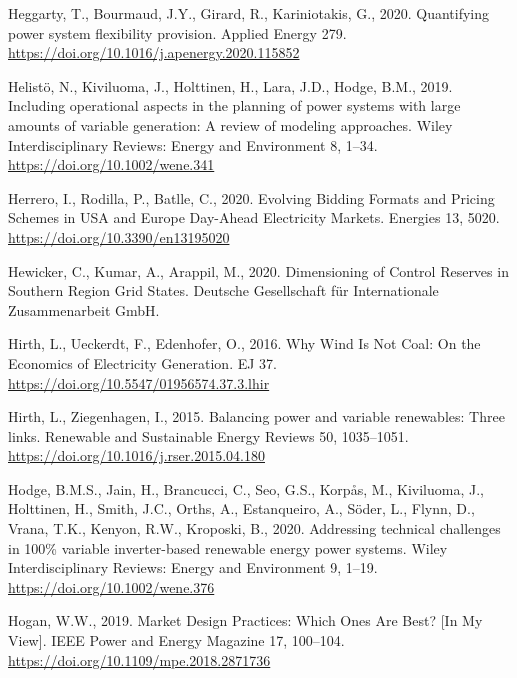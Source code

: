 \documentclass[12pt,a4paper,]{report}
\newlength{\cslhangindent}
\newenvironment{CSLReferences}[2] %
 {%
  \setlength{\parindent}{0pt}
  \ifodd #1 \everypar{\setlength{\hangindent}{\cslhangindent}}\ignorespaces\fi
  \ifnum #2 > 0
  \setlength{\parskip}{#2\baselineskip}
  \fi
 }%
 {}
\begin{document}
\begin{CSLReferences}{1}{0}
\leavevmode{}%
Heggarty, T., Bourmaud, J.Y., Girard, R., Kariniotakis, G., 2020.
Quantifying power system flexibility provision. Applied Energy 279.
\url{https://doi.org/10.1016/j.apenergy.2020.115852}

\leavevmode{}%
Helistö, N., Kiviluoma, J., Holttinen, H., Lara, J.D., Hodge, B.M.,
2019. Including operational aspects in the planning of power systems
with large amounts of variable generation: {A} review of modeling
approaches. Wiley Interdisciplinary Reviews: Energy and Environment 8,
1--34. \url{https://doi.org/10.1002/wene.341}

\leavevmode{}%
Herrero, I., Rodilla, P., Batlle, C., 2020. Evolving {Bidding Formats}
and {Pricing Schemes} in {USA} and {Europe Day-Ahead Electricity
Markets}. Energies 13, 5020. \url{https://doi.org/10.3390/en13195020}

\leavevmode{}%
Hewicker, C., Kumar, A., Arappil, M., 2020. Dimensioning of {Control
Reserves} in {Southern Region Grid States}. {Deutsche Gesellschaft für
Internationale Zusammenarbeit GmbH}.

\leavevmode{}%
Hirth, L., Ueckerdt, F., Edenhofer, O., 2016. Why {Wind Is Not Coal}:
{On} the {Economics} of {Electricity Generation}. EJ 37.
\url{https://doi.org/10.5547/01956574.37.3.lhir}

\leavevmode{}%
Hirth, L., Ziegenhagen, I., 2015. Balancing power and variable
renewables: {Three} links. Renewable and Sustainable Energy Reviews 50,
1035--1051. \url{https://doi.org/10.1016/j.rser.2015.04.180}

\leavevmode{}%
Hodge, B.M.S., Jain, H., Brancucci, C., Seo, G.S., Korpås, M.,
Kiviluoma, J., Holttinen, H., Smith, J.C., Orths, A., Estanqueiro, A.,
Söder, L., Flynn, D., Vrana, T.K., Kenyon, R.W., Kroposki, B., 2020.
Addressing technical challenges in 100\% variable inverter-based
renewable energy power systems. Wiley Interdisciplinary Reviews: Energy
and Environment 9, 1--19. \url{https://doi.org/10.1002/wene.376}

\leavevmode{}%
Hogan, W.W., 2019. Market {Design Practices}: {Which Ones Are Best}?
{[}{In My View}{]}. IEEE Power and Energy Magazine 17, 100--104.
\url{https://doi.org/10.1109/mpe.2018.2871736}


\end{CSLReferences}
\end{document}
